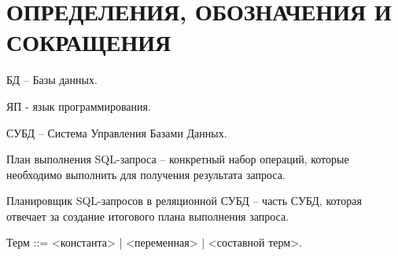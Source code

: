 \chapter*{{\centering ОПРЕДЕЛЕНИЯ, ОБОЗНАЧЕНИЯ И СОКРАЩЕНИЯ}}

БД -- Базы данных.

ЯП - язык программирования.

СУБД -- Система Управления Базами Данных.

План выполнения SQL-запроса -- конкретный набор операций, которые необходимо выполнить для получения результата запроса.

Планировщик SQL-запросов в реляционной СУБД -- часть СУБД, которая отвечает за создание итогового плана выполнения запроса.

Терм ::= <константа> | <переменная> | <составной терм>.